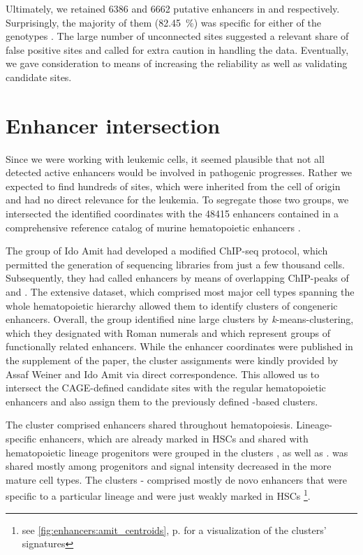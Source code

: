 Ultimately, we retained \num{6386} and \num{6662} putative enhancers in \dnmtwt and \dnmtchip respectively. Surprisingly, the majority of them (\SI{82.45}{\percent}) was specific for either of the genotypes . The large number of unconnected sites suggested a relevant share of false positive sites and called for extra caution in handling the data.
Eventually, we gave consideration to means of increasing the reliability as well as validating candidate sites.

\section{Enhancer intersection}
\label{chap:r:enhancers:intersection}

Since we were working with leukemic cells, it seemed plausible that not all detected active enhancers would be involved in pathogenic progresses. Rather we expected to find hundreds of sites, which were inherited from the cell of origin and had no direct relevance for the leukemia. To segregate those two groups, we intersected the identified coordinates with the \num{48415} enhancers contained in a comprehensive reference catalog of murine hematopoietic enhancers \cite{Lara-Astiaso2014}. 

The group of Ido Amit had developed a modified ChIP-seq protocol, which permitted the generation of sequencing libraries from just a few thousand cells. Subsequently, they had called enhancers by means of overlapping ChIP-peaks of \hisfourone and \histwentysevenac. The extensive dataset, which comprised most major cell types spanning the whole hematopoietic hierarchy allowed them to identify clusters of congeneric enhancers. Overall, the group identified nine large clusters by \textsl{k}-means-clustering, which they designated with Roman numerals and which represent groups of functionally related enhancers\cite{Lara-Astiaso2014}. While the enhancer coordinates were published in the supplement of the paper, the cluster assignments were kindly provided by Assaf Weiner and Ido Amit via direct correspondence. This allowed us to intersect the CAGE-defined candidate sites with the regular hematopoietic enhancers and also assign them to the previously defined \hisfourone-based clusters. 

The cluster \amitone comprised enhancers shared throughout hematopoiesis. Lineage-specific enhancers, which are already marked in HSCs and shared with hematopoietic lineage progenitors were grouped in the clusters ,  as well as . \amitfive was shared mostly among progenitors and signal intensity decreased in the more mature cell types. The clusters - comprised mostly de novo enhancers that were specific to a particular lineage and were just weakly marked in HSCs 	\footnote{see \autoref{fig:enhancers:amit_centroids},{\color{fbbioblue} p.}\pageref{fig:enhancers:amit_centroids} for a visualization of the clusters' \hisfourone signatures}.

